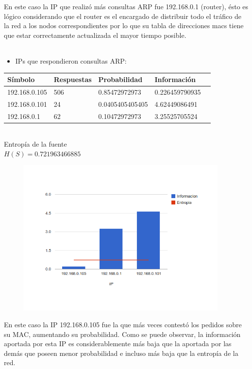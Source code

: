 En este caso la IP que realiz\'o m\'as consultas ARP fue 192.168.0.1 (router), \'esto es l\'ogico considerando que el router es el encargado de distribuir todo el tr\'afico de la red a los nodos correspondientes por lo que su tabla
de direcciones macs tiene que estar correctamente actualizada el mayor tiempo posible.\\\\


\begin{itemize}
 \item  IPs que respondieron consultas ARP:
\end{itemize}

\begin{tabular}{|l|l|l|l|l|}
  \hline
  S\'imbolo & Respuestas & Probabilidad & Informaci\'on \\
  \hline
  192.168.0.105 & 506 & 0.85472972973 & 0.226459790935 \\
  \hline
  192.168.0.101 & 24 & 0.0405405405405 & 4.62449086491 \\
  \hline
  192.168.0.1 & 62 & 0.10472972973 & 3.25525705524\\
  \hline
\end{tabular}\\
 
Entrop\'ia de la fuente\\
$H(S) = 0.721963466885$\\

\begin{figure}[h]
  \centering                                                       
          \includegraphics[width=300pt]{respuestas1.png}
\end{figure}

En este caso la IP 192.168.0.105 fue la que m\'as veces contest\'o los pedidos sobre su MAC, aumentando su probabilidad. Como se puede observar, la informaci\'on
aportada por esta IP es considerablemente m\'as baja que la aportada por las dem\'as que poseen menor probabilidad e incluso m\'as baja que la entrop\'ia de la red.\\\\\\

